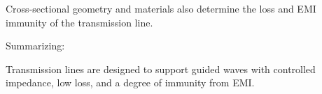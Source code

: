 Cross-sectional geometry and materials also determine the loss and EMI immunity of the transmission line.  

Summarizing:
%
\begin{mdframed}[backgroundcolor=yellow!20,nobreak=true] 
Transmission lines are designed to support guided waves with controlled impedance, low loss, and a degree of immunity from EMI. 
\end{mdframed}



